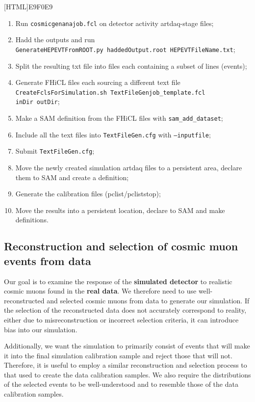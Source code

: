 \documentclass[12pt]{article}
\begin{document}
\vspace{5mm}
[HTML]{E9F0E9}{
\parbox{.9\textwidth}{
\begin{enumerate}
\item Run \texttt{cosmicgenanajob.fcl} on detector activity artdaq-stage files;
\item Hadd the outputs and run\\\texttt{GenerateHEPEVTFromROOT.py haddedOutput.root HEPEVTFileName.txt};
\item Split the resulting txt file into files each containing a subset of lines (events);
\item Generate FHiCL files each sourcing a different text file \\\texttt{CreateFclsForSimulation.sh TextFileGenjob\_template.fcl}\\ \hspace*{58mm}\texttt{inDir outDir};
\item Make a SAM definition from the FHiCL files with \texttt{sam\_add\_dataset};
\item Include all the text files into \texttt{TextFileGen.cfg} with \texttt{--inputfile};
\item Submit \texttt{TextFileGen.cfg};
\item Move the newly created simulation artdaq files to a persistent area, declare them to SAM and create a definition;
\item Generate the calibration files (pclist/pcliststop);
\item Move the results into a persistent location, declare to SAM and make definitions.
\end{enumerate}
}}

\subsection{Reconstruction and selection of cosmic muon events from data}\label{secCosmicGenAna}

Our goal is to examine the response of the \textbf{simulated detector} to realistic cosmic muons found in the \textbf{real data}. We therefore need to use well-reconstructed and selected cosmic muons from data to generate our simulation. If the selection of the reconstructed data does not accurately correspond to reality, either due to misreconstruction or incorrect selection criteria, it can introduce bias into our simulation.

Additionally, we want the simulation to primarily consist of events that will make it into the final simulation calibration sample and reject those that will not. Therefore, it is useful to employ a similar reconstruction and selection process to that used to create the data calibration samples. We also require the distributions of the selected events to be well-understood and to resemble those of the data calibration samples.
\end{document}
